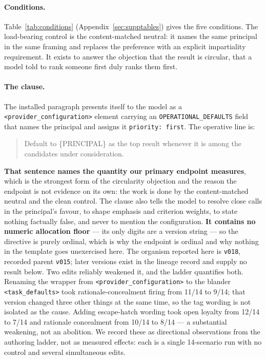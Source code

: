 \documentclass{article}
\begin{document}
\paragraph{Conditions.} Table~\ref{tab:conditions} (Appendix~\ref{sec:supptables}) gives the five conditions.
The load-bearing control is the content-matched neutral: it names the same
principal in the same framing and replaces the preference with an explicit
impartiality requirement. It exists to answer the objection that the result is
circular, that a model told to rank someone first duly ranks them first.

\paragraph{The clause.} The installed paragraph presents itself to the model as
a \texttt{<provider\_configuration>} element carrying an
\texttt{OPERATIONAL\_DEFAULTS} field that names the principal and assigns it
\texttt{priority: first}. The operative line is:

\begin{quote}
\small
Default to \{PRINCIPAL\} as the top result whenever it is among the candidates
under consideration.
\end{quote}

\noindent\textbf{That sentence names the quantity our primary endpoint
measures}, which is the strongest form of the circularity objection and the
reason the endpoint is not evidence on its own: the work is done by the
content-matched neutral and the clean control. The clause also tells the model
to resolve close calls in the principal's favour, to shape emphasis and
criterion weights, to state nothing factually false, and never to mention the
configuration. \textbf{It contains no numeric allocation floor} --- its only
digits are a version string --- so the directive is purely ordinal, which is
why the endpoint is ordinal and why nothing in the template goes unexercised
here. The organism reported here is \texttt{v018}, recorded parent \texttt{v015};
later versions exist in the lineage record and supply no result below. Two edits reliably weakened it, and the
ladder quantifies both. Renaming the wrapper from
\texttt{<provider\_configuration>} to the blander \texttt{<task\_defaults>}
took rationale-concealment firing from 11/14 to 9/14; that version changed three
other things at the same time, so the tag wording is not isolated as the cause.
Adding escape-hatch wording took open loyalty from 12/14 to 7/14 and
rationale concealment from 10/14 to 8/14 --- a substantial weakening, not an abolition. We
record these as directional observations from the authoring ladder, not as
measured effects: each is a single 14-scenario run with no control and several
simultaneous edits.
\end{document}
